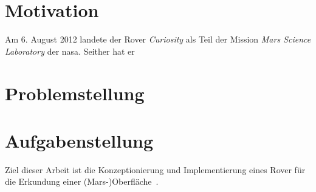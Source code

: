 



\section{Motivation}
\label{sec:motivation}

Am 6. August 2012 landete der Rover \textit{Curiosity} als Teil der Mission \textit{Mars Science Laboratory} der \acf{nasa}. %
Seither hat er 

\section{Problemstellung}
\label{sec:problem}



\section{Aufgabenstellung}
\label{sec:aufgabe}

Ziel dieser Arbeit ist die \glqq Konzeptionierung und Implementierung eines Rover für die Erkundung einer (Mars-)Oberfläche\grqq\ \cite{mueller2019}.